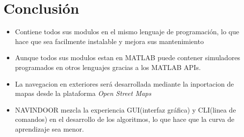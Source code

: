 \section{Conclusión}

\begin{itemize}
    \item Contiene todos sus modulos en el mismo lenguaje de programación, lo que hace que sea facilmente instalable y mejora sus mantenimiento
    \item Aunque todos sus modulos estan en MATLAB puede contener simuladores programados en otros lenguajes gracias a los MATLAB APIs.  
    \item La navegacion en exteriores será desarrollada mediante la inportacion de mapas desde la plataforma \emph{Open Street Maps}
    \item NAVINDOOR mezcla la experiencia GUI(interfaz gráfica) y CLI(linea de comandos) en el desarrollo de los algoritmos, lo que hace que la curva de aprendizaje sea menor.
\end{itemize}
 



